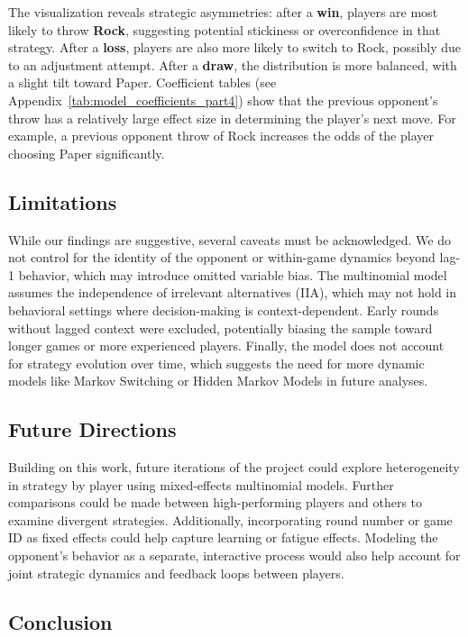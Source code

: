 \documentclass[12pt]{article}
\begin{document}
The visualization reveals strategic asymmetries: after a \textbf{win}, players are most likely to throw \textbf{Rock}, suggesting potential stickiness or overconfidence in that strategy. After a \textbf{loss}, players are also more likely to switch to Rock, possibly due to an adjustment attempt. After a \textbf{draw}, the distribution is more balanced, with a slight tilt toward Paper. Coefficient tables (see Appendix~\ref{tab:model_coefficients_part4}) show that the previous opponent’s throw has a relatively large effect size in determining the player's next move. For example, a previous opponent throw of Rock increases the odds of the player choosing Paper significantly.

\subsection*{Limitations}

While our findings are suggestive, several caveats must be acknowledged. We do not control for the identity of the opponent or within-game dynamics beyond lag-1 behavior, which may introduce omitted variable bias. The multinomial model assumes the independence of irrelevant alternatives (IIA), which may not hold in behavioral settings where decision-making is context-dependent. Early rounds without lagged context were excluded, potentially biasing the sample toward longer games or more experienced players. Finally, the model does not account for strategy evolution over time, which suggests the need for more dynamic models like Markov Switching or Hidden Markov Models in future analyses.

\subsection*{Future Directions}

Building on this work, future iterations of the project could explore heterogeneity in strategy by player using mixed-effects multinomial models. Further comparisons could be made between high-performing players and others to examine divergent strategies. Additionally, incorporating round number or game ID as fixed effects could help capture learning or fatigue effects. Modeling the opponent’s behavior as a separate, interactive process would also help account for joint strategic dynamics and feedback loops between players.

\subsection*{Conclusion}
\end{document}
